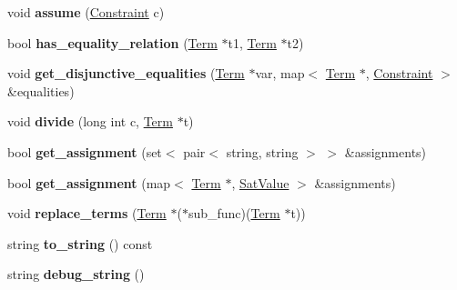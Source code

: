 \begin{DoxyCompactItemize}
\item 
\hypertarget{classConstraint_a5b7687a87d44326b6b9e2cd63b4925f5}{void {\bfseries assume} (\hyperlink{classConstraint}{\-Constraint} c)}\label{classConstraint_a5b7687a87d44326b6b9e2cd63b4925f5}

\item 
\hypertarget{classConstraint_ae36861ed4c196be2d4e9824d6ba0c2d6}{bool {\bfseries has\-\_\-equality\-\_\-relation} (\hyperlink{classTerm}{\-Term} $\ast$t1, \hyperlink{classTerm}{\-Term} $\ast$t2)}\label{classConstraint_ae36861ed4c196be2d4e9824d6ba0c2d6}

\item 
\hypertarget{classConstraint_a7625a7c22ad175129c4fba0d67fb22b1}{void {\bfseries get\-\_\-disjunctive\-\_\-equalities} (\hyperlink{classTerm}{\-Term} $\ast$var, map$<$ \hyperlink{classTerm}{\-Term} $\ast$, \hyperlink{classConstraint}{\-Constraint} $>$ \&equalities)}\label{classConstraint_a7625a7c22ad175129c4fba0d67fb22b1}

\item 
\hypertarget{classConstraint_a0348a4d01b75f207d10b5ca8d526970f}{void {\bfseries divide} (long int c, \hyperlink{classTerm}{\-Term} $\ast$t)}\label{classConstraint_a0348a4d01b75f207d10b5ca8d526970f}

\item 
\hypertarget{classConstraint_aca5219e5b274f9ca2e0876b5cd41a45a}{bool {\bfseries get\-\_\-assignment} (set$<$ pair$<$ string, string $>$ $>$ \&assignments)}\label{classConstraint_aca5219e5b274f9ca2e0876b5cd41a45a}

\item 
\hypertarget{classConstraint_a714cc43955c92eaff09790db26bcce65}{bool {\bfseries get\-\_\-assignment} (map$<$ \hyperlink{classTerm}{\-Term} $\ast$, \hyperlink{classSatValue}{\-Sat\-Value} $>$ \&assignments)}\label{classConstraint_a714cc43955c92eaff09790db26bcce65}

\item 
\hypertarget{classConstraint_a02d6b2e562863ca2eae0d96a7b300dea}{void {\bfseries replace\-\_\-terms} (\hyperlink{classTerm}{\-Term} $\ast$($\ast$sub\-\_\-func)(\hyperlink{classTerm}{\-Term} $\ast$t))}\label{classConstraint_a02d6b2e562863ca2eae0d96a7b300dea}

\item 
\hypertarget{classConstraint_a947b983b8463eefe8d90f536211f4a10}{string {\bfseries to\-\_\-string} () const }\label{classConstraint_a947b983b8463eefe8d90f536211f4a10}

\item 
\hypertarget{classConstraint_a6f31b5e7a2f0df26f15ffd533753f8c8}{string {\bfseries debug\-\_\-string} ()}\label{classConstraint_a6f31b5e7a2f0df26f15ffd533753f8c8}


\end{DoxyCompactItemize}
